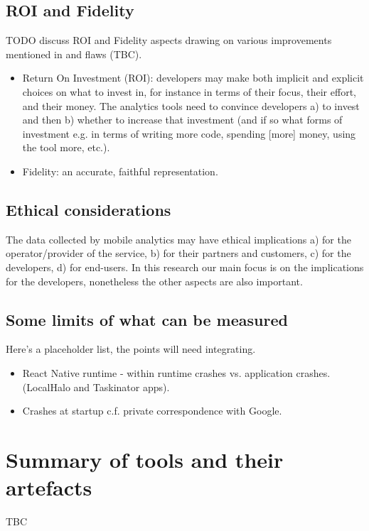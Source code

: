 \subsection{ROI and Fidelity}
TODO discuss ROI and Fidelity aspects drawing on various improvements mentioned in  and flaws (TBC).

\begin{itemize}
    \item Return On Investment (ROI): developers may make both implicit and explicit choices on what to invest in, for instance in terms of their focus, their effort, and their money. The analytics tools need to convince developers a) to invest and then b) whether to increase that investment (and if so what forms of investment e.g. in terms of writing more code, spending [more] money, using the tool more, etc.).
    \item Fidelity: an accurate, faithful representation.
\end{itemize}

\subsection{Ethical considerations}
The data collected by mobile analytics may have ethical implications a) for the operator/provider of the service, b) for their partners and customers, c) for the developers, d) for end-users. In this research our main focus is on the implications for the developers, nonetheless the other aspects are also important.


\subsection{Some limits of what can be measured}

Here's a placeholder list, the points will need integrating.
\begin{itemize}
    \item React Native runtime - within runtime crashes vs. application crashes. (LocalHalo and Taskinator apps).
    \item Crashes at startup c.f. private correspondence with Google.
\end{itemize}


\section{Summary of tools and their artefacts}
TBC